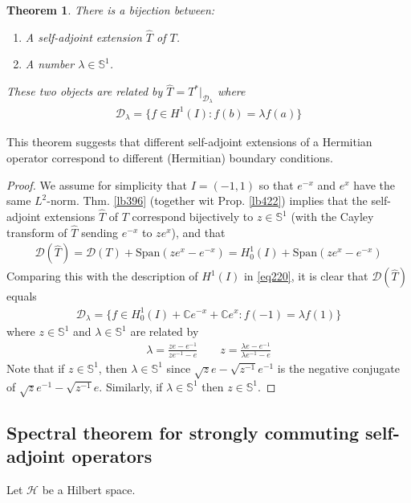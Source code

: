 \documentclass[12pt,b5paper,notitlepage]{article}
\theoremstyle{definition}
\theoremstyle{plain}
\newtheorem{thm}[df]{Theorem}
\newcommand{\wht}{\widehat}
\newcommand{\Dom}{\mathscr{D}}
\newcommand{\Span}{\mathrm{Span}}
\newcommand{\Cbb}{\mathbb C}
\newcommand{\Sbb}{{\mathbb S}}
\newcommand{\MH}{\mathcal H}
\numberwithin{equation}{section}
\begin{document}
\begin{thm}
There is a bijection between:
\begin{enumerate}
\item[(1)] A self-adjoint extension $\wht T$ of $T$.
\item[(2)] A number $\lambda\in\Sbb^1$. 
\end{enumerate}
These two objects are related by $\wht T=T^*|_{\Dom_\lambda}$ where
\begin{align*}
\Dom_\lambda=\{f\in H^1(I):f(b)=\lambda f(a)\}
\end{align*}
\end{thm}

This theorem suggests that different self-adjoint extensions of a Hermitian operator correspond to different (Hermitian) boundary conditions.

\begin{proof}
We assume for simplicity that $I=(-1,1)$ so that $e^{-x}$ and $e^x$ have the same $L^2$-norm. Thm. \ref{lb396} (together wit Prop. \ref{lb422}) implies that the self-adjoint extensions $\wht T$ of $T$ correspond bijectively to $z\in\Sbb^1$ (with the Cayley transform of $\wht T$ sending $e^{-x}$ to $ze^x$), and that
\begin{align*}
\Dom(\wht T)=\Dom(T)+\Span (ze^x-e^{-x})=H^1_0(I)+\Span (ze^x-e^{-x})
\end{align*}
Comparing this with the description of $H^1(I)$ in \eqref{eq220}, it is clear that $\Dom(\wht T)$ equals
\begin{align*}
\Dom_\lambda=\{f\in H^1_0(I)+\Cbb e^{-x}+\Cbb e^x:f(-1)=\lambda f(1)\}
\end{align*}
where $z\in\Sbb^1$ and $\lambda\in\Sbb^1$ are related by
\begin{align*}
\lambda=\frac{ze-e^{-1}}{ze^{-1}-e}\qquad z=\frac{\lambda e-e^{-1}}{\lambda e^{-1}-e}
\end{align*}
Note that if $z\in\Sbb^1$, then $\lambda\in\Sbb^1$ since $\sqrt{z}e-\sqrt{z^{-1}}e^{-1}$ is the negative conjugate of $\sqrt ze^{-1}-\sqrt{z^{-1}}e$. Similarly, if $\lambda\in\Sbb^1$ then $z\in\Sbb^1$.
\end{proof}



\subsection{Spectral theorem for strongly commuting self-adjoint operators}


Let $\MH$ be a Hilbert space.
\end{document}
